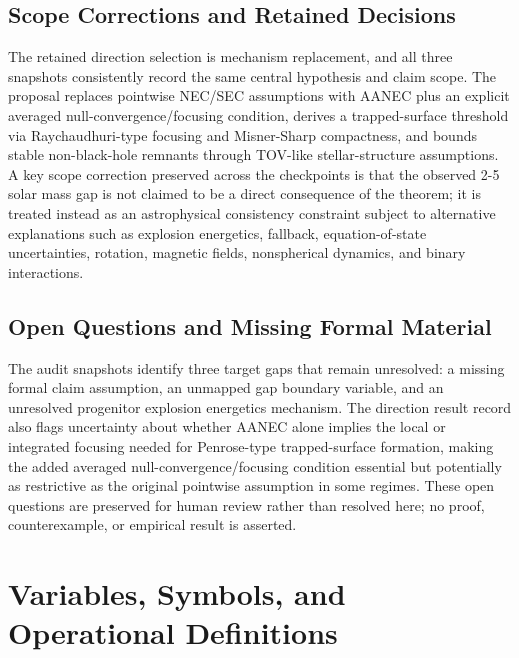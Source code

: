 \documentclass[conference]{IEEEtran}
\begin{document}
\subsection{Scope Corrections and Retained Decisions}
The retained direction selection is mechanism replacement, and all three snapshots consistently record the same central hypothesis and claim scope. The proposal replaces pointwise NEC/SEC assumptions with AANEC plus an explicit averaged null-convergence/focusing condition, derives a trapped-surface threshold via Raychaudhuri-type focusing and Misner-Sharp compactness, and bounds stable non-black-hole remnants through TOV-like stellar-structure assumptions. A key scope correction preserved across the checkpoints is that the observed 2-5 solar mass gap is not claimed to be a direct consequence of the theorem; it is treated instead as an astrophysical consistency constraint subject to alternative explanations such as explosion energetics, fallback, equation-of-state uncertainties, rotation, magnetic fields, nonspherical dynamics, and binary interactions.

\subsection{Open Questions and Missing Formal Material}
The audit snapshots identify three target gaps that remain unresolved: a missing formal claim assumption, an unmapped gap boundary variable, and an unresolved progenitor explosion energetics mechanism. The direction result record also flags uncertainty about whether AANEC alone implies the local or integrated focusing needed for Penrose-type trapped-surface formation, making the added averaged null-convergence/focusing condition essential but potentially as restrictive as the original pointwise assumption in some regimes. These open questions are preserved for human review rather than resolved here; no proof, counterexample, or empirical result is asserted.

\section{Variables, Symbols, and Operational Definitions}
\end{document}
